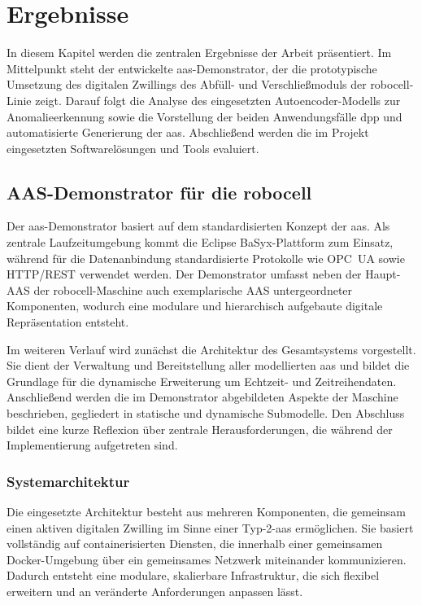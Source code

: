 \newpage
\section{Ergebnisse}
In diesem Kapitel werden die zentralen Ergebnisse der Arbeit präsentiert.
Im Mittelpunkt steht der entwickelte \acs{aas}-Demonstrator, der die prototypische Umsetzung des digitalen Zwillings des Abfüll- und Verschließmoduls der robocell-Linie zeigt.
Darauf folgt die Analyse des eingesetzten Autoencoder-Modells zur Anomalieerkennung sowie die Vorstellung der beiden Anwendungsfälle \acs{dpp} und automatisierte Generierung der \acs{aas}.
Abschließend werden die im Projekt eingesetzten Softwarelösungen und Tools evaluiert.

\subsection{AAS-Demonstrator für die robocell}
\label{sec:AAS-Demonstrator}
Der \acs{aas}-Demonstrator basiert auf dem standardisierten Konzept der \acs{aas}.
Als zentrale Laufzeitumgebung kommt die Eclipse BaSyx-Plattform zum Einsatz, während für die Datenanbindung standardisierte Protokolle wie OPC~UA sowie HTTP/REST verwendet werden.
Der Demonstrator umfasst neben der Haupt-AAS der robocell-Maschine auch exemplarische AAS untergeordneter Komponenten, wodurch eine modulare und hierarchisch aufgebaute digitale Repräsentation entsteht.

Im weiteren Verlauf wird zunächst die Architektur des Gesamtsystems vorgestellt.
Sie dient der Verwaltung und Bereitstellung aller modellierten \acs{aas} und bildet die Grundlage für die dynamische Erweiterung um Echtzeit- und Zeitreihendaten.
Anschließend werden die im Demonstrator abgebildeten Aspekte der Maschine beschrieben, gegliedert in statische und dynamische Submodelle.
Den Abschluss bildet eine kurze Reflexion über zentrale Herausforderungen, die während der Implementierung aufgetreten sind.

\subsubsection{Systemarchitektur}
Die eingesetzte Architektur besteht aus mehreren Komponenten, die gemeinsam einen aktiven digitalen Zwilling im Sinne einer Typ-2-\acs{aas} ermöglichen.
Sie basiert vollständig auf containerisierten Diensten, die innerhalb einer gemeinsamen Docker-Umgebung über ein gemeinsames Netzwerk miteinander kommunizieren.
Dadurch entsteht eine modulare, skalierbare Infrastruktur, die sich flexibel erweitern und an veränderte Anforderungen anpassen lässt.


